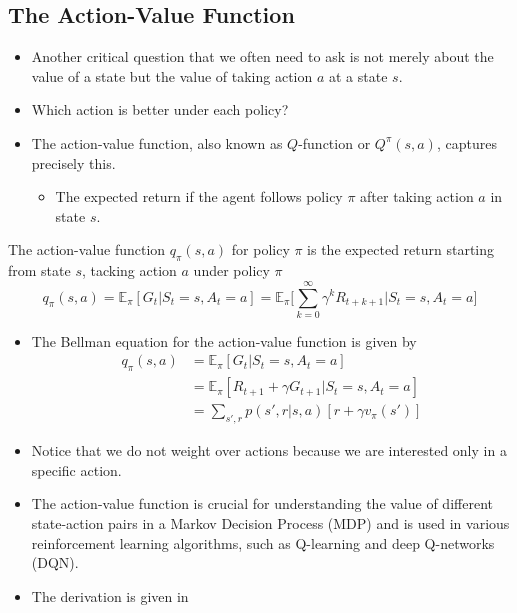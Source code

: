 



\subsection{The Action-Value Function}
\begin{itemize}
	\item Another critical question that we often need to ask is not merely about the value of a state but the value of taking action $a$ at a state $s$.
	\item Which action is better under each policy?
	\item The action-value function, also known as $Q$-function or $Q^\pi(s,a)$, captures precisely this.
		\begin{itemize}
			\item The expected return if the agent follows policy $\pi$ after taking action $a$ in state $s$.
		\end{itemize}
\end{itemize}

\begin{definition}
	The action-value function $q_{\pi}(s,a)$ for policy $\pi$ is the expected return starting from state $s$, tacking action $a$ under policy $\pi$
	$$q_{\pi}(s,a) = \mathbb{E}_\pi[G_t|S_t=s, A_t=a]=\mathbb{E}_\pi\Bigg[\sum_{k=0}^{\infty}\gamma^k R_{t+k+1}\Bigg| S_t=s, A_t=a\Bigg]$$
\end{definition}

\begin{itemize}
	\item The Bellman equation for the action-value function is given by
	\begin{align*}
		q_{\pi}(s,a) &= \mathbb{E}_\pi[G_t|S_t=s, A_t=a]\\
		& = \mathbb{E}_\pi[R_{t+1} + \gamma G_{t+1}|S_t=s, A_t=a]\\
		& = \sum_{s',r}p(s',r|s,a)[r + \gamma v_\pi(s')]
	\end{align*}
	\item Notice that we do not weight over actions because we are interested only in a specific action.
	\item The action-value function is crucial for understanding the value of different state-action pairs in a Markov Decision Process (MDP) and is used in various reinforcement learning algorithms, such as Q-learning and deep Q-networks (DQN).
	\item The derivation is given in 
\end{itemize}

